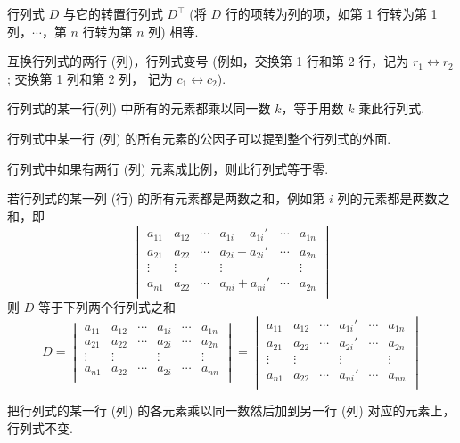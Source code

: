 \begin{theorem}
    行列式 $ D $ 与它的转置行列式 $ D^{\top} $ (将 $ D $ 行的项转为列的项，如第 1 行转为第 1 列，$ \cdots $，第 $ n $ 行转为第 $ n $ 列) 相等.
\end{theorem}
\begin{theorem}
    互换行列式的两行 (列)，行列式变号 (例如，交换第 1 行和第 2 行，记为 $ r_{1} \leftrightarrow r_{2} $; 交换第 1 列和第 2 列，
    记为 $ c_{1} \leftrightarrow c_{2} $).
\end{theorem}
\begin{theorem}
    行列式的某一行(列) 中所有的元素都乘以同一数 $ k $，等于用数 $ k $ 乘此行列式.
\end{theorem}
\begin{inference}
    行列式中某一行 (列) 的所有元素的公因子可以提到整个行列式的外面.
\end{inference}
\begin{theorem}
    行列式中如果有两行 (列) 元素成比例，则此行列式等于零.
\end{theorem}
\begin{theorem}
    若行列式的某一列 (行) 的所有元素都是两数之和，例如第 $ i $ 列的元素都是两数之和，即
    $$\begin{vmatrix}
            a_{11} & a_{12} & \cdots & a_{1i}+a_{1i}' & \cdots & a_{1n} \\
            a_{21} & a_{22} & \cdots & a_{2i}+a_{2i}' & \cdots & a_{2n} \\
            \vdots & \vdots &        & \vdots         &        & \vdots \\
            a_{n1} & a_{22} & \cdots & a_{ni}+a_{ni}' & \cdots & a_{2n} \\
        \end{vmatrix}$$
    则 $D$ 等于下列两个行列式之和
    $$D=\begin{vmatrix}
            a_{11} & a_{12} & \cdots & a_{1i} & \cdots & a_{1n} \\
            a_{21} & a_{22} & \cdots & a_{2i} & \cdots & a_{2n} \\
            \vdots & \vdots &        & \vdots &        & \vdots \\
            a_{n1} & a_{22} & \cdots & a_{2i} & \cdots & a_{nn} \\
        \end{vmatrix}
        =\begin{vmatrix}
            a_{11} & a_{12} & \cdots & a_{1i}' & \cdots & a_{1n} \\
            a_{21} & a_{22} & \cdots & a_{2i}' & \cdots & a_{2n} \\
            \vdots & \vdots &        & \vdots  &        & \vdots \\
            a_{n1} & a_{22} & \cdots & a_{ni}' & \cdots & a_{nn} \\
        \end{vmatrix}$$
\end{theorem}
\begin{theorem}
    把行列式的某一行 (列) 的各元素乘以同一数然后加到另一行 (列) 对应的元素上，行列式不变.
\end{theorem}

